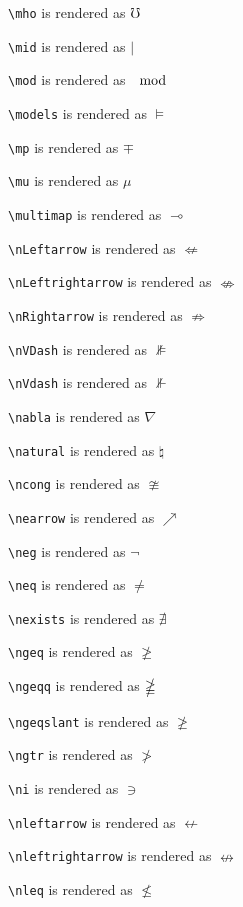 \texttt{\textbackslash mho} is rendered as $\mho$

\texttt{\textbackslash mid} is rendered as $\mid$

\texttt{\textbackslash mod} is rendered as $\mod$

\texttt{\textbackslash models} is rendered as $\models$

\texttt{\textbackslash mp} is rendered as $\mp$

\texttt{\textbackslash mu} is rendered as $\mu$

\texttt{\textbackslash multimap} is rendered as $\multimap$

\texttt{\textbackslash nLeftarrow} is rendered as $\nLeftarrow$

\texttt{\textbackslash nLeftrightarrow} is rendered as $\nLeftrightarrow$

\texttt{\textbackslash nRightarrow} is rendered as $\nRightarrow$

\texttt{\textbackslash nVDash} is rendered as $\nVDash$

\texttt{\textbackslash nVdash} is rendered as $\nVdash$

\texttt{\textbackslash nabla} is rendered as $\nabla$

\texttt{\textbackslash natural} is rendered as $\natural$

\texttt{\textbackslash ncong} is rendered as $\ncong$

\texttt{\textbackslash nearrow} is rendered as $\nearrow$

\texttt{\textbackslash neg} is rendered as $\neg$

\texttt{\textbackslash neq} is rendered as $\neq$

\texttt{\textbackslash nexists} is rendered as $\nexists$

\texttt{\textbackslash ngeq} is rendered as $\ngeq$

\texttt{\textbackslash ngeqq} is rendered as $\ngeqq$

\texttt{\textbackslash ngeqslant} is rendered as $\ngeqslant$

\texttt{\textbackslash ngtr} is rendered as $\ngtr$

\texttt{\textbackslash ni} is rendered as $\ni$

\texttt{\textbackslash nleftarrow} is rendered as $\nleftarrow$

\texttt{\textbackslash nleftrightarrow} is rendered as $\nleftrightarrow$

\texttt{\textbackslash nleq} is rendered as $\nleq$

